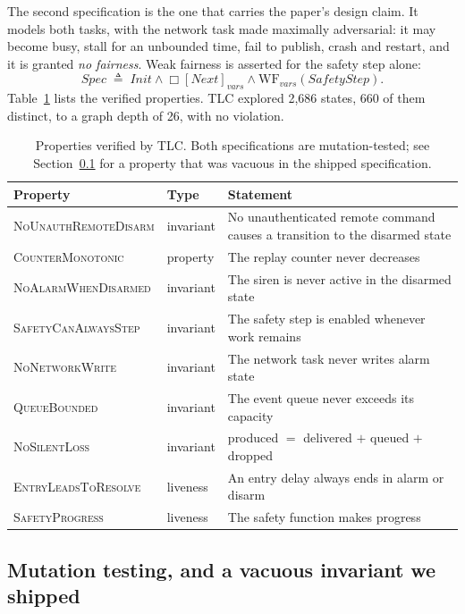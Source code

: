 The second specification is the one that carries the paper's design claim. It models both tasks,
with the network task made maximally adversarial: it may become busy, stall for an unbounded
time, fail to publish, crash and restart, and it is granted \emph{no fairness}. Weak fairness is
asserted for the safety step alone:
\begin{equation}
\mathit{Spec} \;\triangleq\; \mathit{Init} \wedge \Box[\mathit{Next}]_{\mathit{vars}} \wedge
\mathrm{WF}_{\mathit{vars}}(\mathit{SafetyStep}).
\label{eq:spec}
\end{equation}
Table~\ref{tab:properties} lists the verified properties. TLC explored 2{,}686 states, 660 of
them distinct, to a graph depth of 26, with no violation.

\begin{table}[htbp]
\centering\small
\caption{Properties verified by TLC. Both specifications are mutation-tested; see
Section~\ref{sec:vacuity} for a property that was vacuous in the shipped specification.}
\label{tab:properties}
\begin{tabular}{@{}llp{}@{}}
\toprule
Property & Type & Statement \\
\midrule
\textsc{NoUnauthRemoteDisarm} & invariant & No unauthenticated remote command causes a transition to the disarmed state \\
\textsc{CounterMonotonic}     & property  & The replay counter never decreases \\
\textsc{NoAlarmWhenDisarmed}  & invariant & The siren is never active in the disarmed state \\
\textsc{SafetyCanAlwaysStep}  & invariant & The safety step is enabled whenever work remains \\
\textsc{NoNetworkWrite}       & invariant & The network task never writes alarm state \\
\textsc{QueueBounded}         & invariant & The event queue never exceeds its capacity \\
\textsc{NoSilentLoss}         & invariant & produced $=$ delivered $+$ queued $+$ dropped \\
\textsc{EntryLeadsToResolve}  & liveness  & An entry delay always ends in alarm or disarm \\
\textsc{SafetyProgress}       & liveness  & The safety function makes progress \\
\bottomrule
\end{tabular}
\end{table}

\subsection{Mutation testing, and a vacuous invariant we shipped}\label{sec:vacuity}

